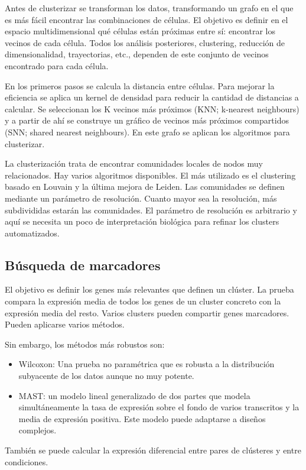 Antes de clusterizar se transforman los datos, transformando un grafo en el que es más fácil encontrar las combinaciones de células. 
El objetivo es definir en el espacio multidimensional qué células están próximas entre sí: encontrar los vecinos de cada célula. Todos los análisis posteriores, clustering, reducción de dimensionalidad, trayectorias, etc., dependen de este conjunto de vecinos encontrado para cada célula.

En los primeros pasos se calcula la distancia entre células. Para mejorar la eficiencia se aplica un kernel de densidad para reducir la cantidad de distancias a calcular. Se seleccionan los K vecinos más próximos (KNN; k-nearest neighbours) y a partir de ahí se construye un gráfico de vecinos más próximos compartidos (SNN; shared nearest neighbours). En este grafo se aplican los algoritmos para clusterizar.

La clusterización trata de encontrar comunidades locales de nodos muy relacionados. Hay varios algoritmos disponibles. El más utilizado es el clustering basado en Louvain y la última mejora de Leiden. Las comunidades se definen mediante un parámetro de resolución. Cuanto mayor sea la resolución, más subdivididas estarán las comunidades. El parámetro de resolución es arbitrario y aquí se necesita un poco de interpretación biológica para refinar los clusters automatizados.

\subsection{Búsqueda de marcadores}
El objetivo es definir los genes más relevantes que definen un clúster. La prueba compara la expresión media de todos los genes de un cluster concreto con la expresión media del resto. Varios clusters pueden compartir genes marcadores. Pueden aplicarse varios métodos.

Sin embargo, los métodos más robustos son:
\begin{itemize}
\item Wilcoxon: Una prueba no paramétrica que es robusta a la distribución subyacente de los datos aunque no muy potente.
\item  MAST: un modelo lineal generalizado de dos partes que modela simultáneamente la tasa de expresión sobre el fondo de varios transcritos y la media de expresión positiva. Este modelo puede adaptarse a diseños complejos.
\end{itemize}

También se puede calcular la expresión diferencial entre pares de clústeres y entre condiciones.




